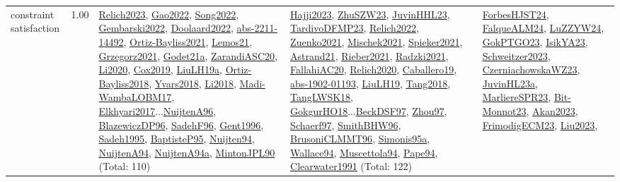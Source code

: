 {\begin{longtable}{p{3cm}r>{\raggedright\arraybackslash}p{6cm}>{\raggedright\arraybackslash}p{6cm}>{\raggedright\arraybackslash}p{8cm}}
\index{constraint satisfaction}\index{CP!constraint satisfaction}constraint satisfaction &  1.00 & \hyperref[detail:Relich2023]{Relich2023}, \hyperref[detail:Gao2022]{Gao2022}, \hyperref[detail:Song2022]{Song2022}, \hyperref[detail:Gembarski2022]{Gembarski2022}, \hyperref[detail:Doolaard2022]{Doolaard2022}, \hyperref[detail:abs-2211-14492]{abs-2211-14492}, \hyperref[detail:Ortiz-Bayliss2021]{Ortiz-Bayliss2021}, \hyperref[detail:Lemos21]{Lemos21}, \hyperref[detail:Grzegorz2021]{Grzegorz2021}, \hyperref[detail:Godet21a]{Godet21a}, \hyperref[detail:ZarandiASC20]{ZarandiASC20}, \hyperref[detail:Li2020]{Li2020}, \hyperref[detail:Cox2019]{Cox2019}, \hyperref[detail:LiuLH19a]{LiuLH19a}, \hyperref[detail:Ortiz-Bayliss2018]{Ortiz-Bayliss2018}, \hyperref[detail:Yvars2018]{Yvars2018}, \hyperref[detail:Li2018]{Li2018}, \hyperref[detail:Madi-WambaLOBM17]{Madi-WambaLOBM17}, \hyperref[detail:Elkhyari2017]{Elkhyari2017}...\hyperref[detail:NuijtenA96]{NuijtenA96}, \hyperref[detail:BlazewiczDP96]{BlazewiczDP96}, \hyperref[detail:SadehF96]{SadehF96}, \hyperref[detail:Gent1996]{Gent1996}, \hyperref[detail:Sadeh1995]{Sadeh1995}, \hyperref[detail:BaptisteP95]{BaptisteP95}, \hyperref[detail:Nuijten94]{Nuijten94}, \hyperref[detail:NuijtenA94]{NuijtenA94}, \hyperref[detail:NuijtenA94a]{NuijtenA94a}, \hyperref[detail:MintonJPL90]{MintonJPL90} (Total: 110) & \hyperref[detail:Hajji2023]{Hajji2023}, \hyperref[detail:ZhuSZW23]{ZhuSZW23}, \hyperref[detail:JuvinHHL23]{JuvinHHL23}, \hyperref[detail:TardivoDFMP23]{TardivoDFMP23}, \hyperref[detail:Relich2022]{Relich2022}, \hyperref[detail:Zuenko2021]{Zuenko2021}, \hyperref[detail:Mischek2021]{Mischek2021}, \hyperref[detail:Spieker2021]{Spieker2021}, \hyperref[detail:Astrand21]{Astrand21}, \hyperref[detail:Rieber2021]{Rieber2021}, \hyperref[detail:Radzki2021]{Radzki2021}, \hyperref[detail:FallahiAC20]{FallahiAC20}, \hyperref[detail:Relich2020]{Relich2020}, \hyperref[detail:Caballero19]{Caballero19}, \hyperref[detail:abs-1902-01193]{abs-1902-01193}, \hyperref[detail:LiuLH19]{LiuLH19}, \hyperref[detail:Tang2018]{Tang2018}, \hyperref[detail:TangLWSK18]{TangLWSK18}, \hyperref[detail:GokgurHO18]{GokgurHO18}...\hyperref[detail:BeckDSF97]{BeckDSF97}, \hyperref[detail:Zhou97]{Zhou97}, \hyperref[detail:Schaerf97]{Schaerf97}, \hyperref[detail:SmithBHW96]{SmithBHW96}, \hyperref[detail:BrusoniCLMMT96]{BrusoniCLMMT96}, \hyperref[detail:Simonis95a]{Simonis95a}, \hyperref[detail:Wallace94]{Wallace94}, \hyperref[detail:Muscettola94]{Muscettola94}, \hyperref[detail:Pape94]{Pape94}, \hyperref[detail:Clearwater1991]{Clearwater1991} (Total: 122) & \hyperref[detail:ForbesHJST24]{ForbesHJST24}, \hyperref[detail:FalqueALM24]{FalqueALM24}, \hyperref[detail:LuZZYW24]{LuZZYW24}, \hyperref[detail:GokPTGO23]{GokPTGO23}, \hyperref[detail:IsikYA23]{IsikYA23}, \hyperref[detail:Schweitzer2023]{Schweitzer2023}, \hyperref[detail:CzerniachowskaWZ23]{CzerniachowskaWZ23}, \hyperref[detail:JuvinHL23a]{JuvinHL23a}, \hyperref[detail:MarliereSPR23]{MarliereSPR23}, \hyperref[detail:Bit-Monnot23]{Bit-Monnot23}, \hyperref[detail:Akan2023]{Akan2023}, \hyperref[detail:FrimodigECM23]{FrimodigECM23}, \hyperref[detail:Liu2023]{Liu2023}, 
\end{longtable}}
